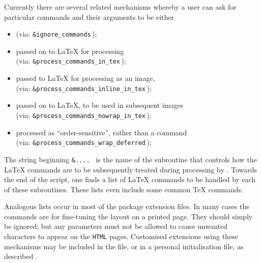 Currently there are several related mechanisms whereby a user 
can ask for particular commands and their arguments to be either 
\begin{itemize}
\item
{} (via: \texttt{\&ignore\_commands}\,);
\item
passed on to \LaTeX{}  for processing \\
(via: \texttt{\&process\_commands\_in\_tex}\,);
\item
passed to \LaTeX{}  for processing as an image, 
\\
(via: \texttt{\&process\_commands\_inline\_in\_tex}\,);
\item
passed on to \LaTeX,  
to be used in subsequent images\\
(via: \texttt{\&process\_commands\_nowrap\_in\_tex}\,);
\item
processed as ``order-sensitive'',  
rather than a command\\
(via: \texttt{\&process\_commands\_wrap\_deferred}\,);
\end{itemize}
The string beginning \texttt{\&.... } is the name of the \Perl{} subroutine 
that controls how the \LaTeX{} commands are to be subsequently treated during
processing by \latextohtml.
Towards the end of the  script, one finds a list
of \LaTeX{} commands to be handled by each of these subroutines.
These lists even include some common \TeX{} commands.

Analogous lists occur in most of the package extension files.
In many cases the commands are for fine-tuning the layout on
a printed page. They should simply be ignored; but any parameters
must not be allowed to cause unwanted characters to appear on
the \texttt{HTML} pages.
Customised extensions using these mechanisms may be included in the 
 file, or in a personal 
 initialisation file, 
as described .



